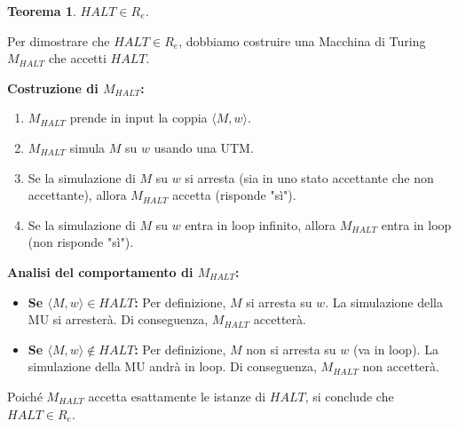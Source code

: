 \documentclass[a4paper]{article}
\makeatletter
\newtheorem{theorem}{Teorema}[section] %
\renewenvironment{proof}[1][\proofname]{\par
  \pushQED{\qed}%
  \normalfont \topsep6\p@\@plus6\p@\relax
  \trivlist
  \item[\hskip\labelsep
        \bfseries
    #1\@addpunct{.}]\ignorespaces
}{%
  \popQED\endtrivlist\@endpefalse
}
\makeatother
\begin{document}
\begin{theorem}
$HALT \in R_e$.
\end{theorem}
\begin{proof}
Per dimostrare che $HALT \in R_e$, dobbiamo costruire una Macchina di Turing $M_{HALT}$ che accetti $HALT$.

\textbf{Costruzione di $M_{HALT}$:}
\begin{enumerate}
    \item $M_{HALT}$ prende in input la coppia $\langle M, w \rangle$.
    \item $M_{HALT}$ simula $M$ su $w$ usando una UTM.
    \item Se la simulazione di $M$ su $w$ si arresta (sia in uno stato accettante che non accettante), allora $M_{HALT}$ accetta (risponde "sì").
    \item Se la simulazione di $M$ su $w$ entra in loop infinito, allora $M_{HALT}$ entra in loop (non risponde "sì").
\end{enumerate}
\textbf{Analisi del comportamento di $M_{HALT}$:}
\begin{itemize}
    \item \textbf{Se $\langle M, w \rangle \in HALT$:}
    Per definizione, $M$ si arresta su $w$. La simulazione della MU si arresterà. Di conseguenza, $M_{HALT}$ accetterà.
    \item \textbf{Se $\langle M, w \rangle \notin HALT$:}
    Per definizione, $M$ non si arresta su $w$ (va in loop). La simulazione della MU andrà in loop. Di conseguenza, $M_{HALT}$ non accetterà.
\end{itemize}
Poiché $M_{HALT}$ accetta esattamente le istanze di $HALT$, si conclude che $HALT \in R_e$.
\end{proof}
\end{document}
